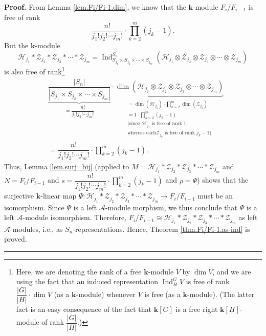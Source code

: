 \documentclass[numbers=enddot,12pt,final,onecolumn,notitlepage]{scrartcl}%
\theoremstyle{definition}
\newenvironment{proof}[1][Proof]{\noindent\textbf{#1.} }{\ \rule{0.5em}{0.5em}}
\let\prodnonlimits\prod
\renewcommand{\prod}{\prodnonlimits\limits}
\begin{document}
\begin{proof}
From Lemma \ref{lem.Fi/Fi-1.dim}, we know that the $\mathbf{k}$-module
$F_{i}/F_{i-1}$ is free of rank%
\[
\dfrac{n!}{j_{1}!j_{2}!\cdots j_{m}!}\cdot\prod_{k=2}^{m}\left(
j_{k}-1\right)  .
\]
But the $\mathbf{k}$-module
\[
\mathcal{H}_{j_{1}}\ast\mathcal{Z}_{j_{2}}\ast\mathcal{Z}_{j_{3}}\ast
\cdots\ast\mathcal{Z}_{j_{m}}=\operatorname*{Ind}\nolimits_{S_{j_{1}}\times
S_{j_{2}}\times\cdots\times S_{j_{m}}}^{S_{n}}\left(  \mathcal{H}_{j_{1}%
}\otimes\mathcal{Z}_{j_{2}}\otimes\mathcal{Z}_{j_{3}}\otimes\cdots
\otimes\mathcal{Z}_{j_{m}}\right)
\]
is also free of rank\footnote{Here, we are denoting the rank of a free
$\mathbf{k}$-module $V$ by $\dim V$, and we are using the fact that an induced
representation $\operatorname*{Ind}\nolimits_{H}^{G}V$ is free of rank
$\dfrac{\left\vert G\right\vert }{\left\vert H\right\vert }\cdot\dim V$ (as a
$\mathbf{k}$-module) whenever $V$ is free (as a $\mathbf{k}$-module). (The
latter fact is an easy consequence of the fact that $\mathbf{k}\left[
G\right]  $ is a free right $\mathbf{k}\left[  H\right]  $-module of rank
$\dfrac{\left\vert G\right\vert }{\left\vert H\right\vert }$.)}%
\begin{align*}
&  \underbrace{\dfrac{\left\vert S_{n}\right\vert }{\left\vert S_{j_{1}}\times
S_{j_{2}}\times\cdots\times S_{j_{m}}\right\vert }}_{=\dfrac{n!}{j_{1}%
!j_{2}!\cdots j_{m}!}}\cdot\underbrace{\dim\left(  \mathcal{H}_{j_{1}}%
\otimes\mathcal{Z}_{j_{2}}\otimes\mathcal{Z}_{j_{3}}\otimes\cdots
\otimes\mathcal{Z}_{j_{m}}\right)  }_{\substack{=\dim\left(  \mathcal{H}%
_{j_{1}}\right)  \cdot\prod_{k=2}^{m}\dim\left(  \mathcal{Z}_{j_{k}}\right)
\\=1\cdot\prod_{k=2}^{m}\left(  j_{k}-1\right)  \\\text{(since }%
\mathcal{H}_{j_{1}}\text{ is free of rank }1\text{,}\\\text{whereas each
}\mathcal{Z}_{j_{k}}\text{ is free of rank }j_{k}-1\text{)}}}\\
&  =\dfrac{n!}{j_{1}!j_{2}!\cdots j_{m}!}\cdot\prod_{k=2}^{m}\left(
j_{k}-1\right)  .
\end{align*}
Thus, Lemma \ref{lem.surj=bij} (applied to $M=\mathcal{H}_{j_{1}}%
\ast\mathcal{Z}_{j_{2}}\ast\mathcal{Z}_{j_{3}}\ast\cdots\ast\mathcal{Z}%
_{j_{m}}$ and $N=F_{i}/F_{i-1}$ and $s=\dfrac{n!}{j_{1}!j_{2}!\cdots j_{m}%
!}\cdot\prod_{k=2}^{m}\left(  j_{k}-1\right)  $ and $\rho=\Psi$) shows that
the surjective $\mathbf{k}$-linear map $\Psi:\mathcal{H}_{j_{1}}%
\ast\mathcal{Z}_{j_{2}}\ast\mathcal{Z}_{j_{3}}\ast\cdots\ast\mathcal{Z}%
_{j_{m}}\rightarrow F_{i}/F_{i-1}$ must be an isomorphism. Since $\Psi$ is a
left $\mathcal{A}$-module morphism, we thus conclude that $\Psi$ is a left
$\mathcal{A}$-module isomorphism. Therefore, $F_{i}/F_{i-1}\cong%
\mathcal{H}_{j_{1}}\ast\mathcal{Z}_{j_{2}}\ast\mathcal{Z}_{j_{3}}\ast
\cdots\ast\mathcal{Z}_{j_{m}}$ as left $\mathcal{A}$-modules, i.e., as $S_{n}%
$-representations. Hence, Theorem \ref{thm.Fi/Fi-1.as-ind} is proved.
\end{proof}
\end{document}
